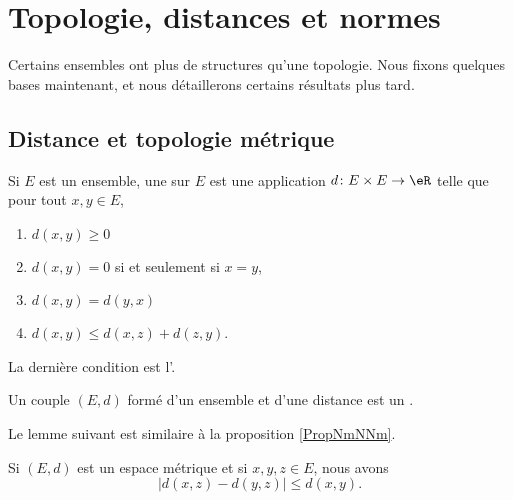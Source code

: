 \section{Topologie, distances et normes}
Certains ensembles ont plus de structures qu'une topologie. Nous fixons quelques bases maintenant, et nous détaillerons certains résultats plus tard.

\subsection{Distance et topologie métrique}

\begin{definition}  \label{DefMVNVFsX}
	Si \( E\) est un ensemble, une  sur \( E\) est une application \( d\colon E\times E\to \eR\) telle que pour tout \( x,y\in E\),
	\begin{enumerate}

		\item
		      \( d(x,y)\geq 0\)

		\item
		      \( d(x,y)=0\) si et seulement si \( x=y\),

		\item
		      \( d(x,y)=d(y,x)\)

		\item
		      \( d(x,y)\leq d(x,z)+d(z,y)\).

	\end{enumerate}
	La dernière condition est l'.

	Un couple \( (E,d)\) formé d'un ensemble et d'une distance est un .
\end{definition}

Le lemme suivant est similaire à la proposition \ref{PropNmNNm}.
\begin{lemma}		\label{LEMooXCXHooVtrkvl}
	Si \( (E,d)\) est un espace métrique et si \( x,y,z\in E\), nous avons
	\begin{equation}
		| d(x,z)-d(y,z) |\leq d(x,y).
	\end{equation}
\end{lemma}

